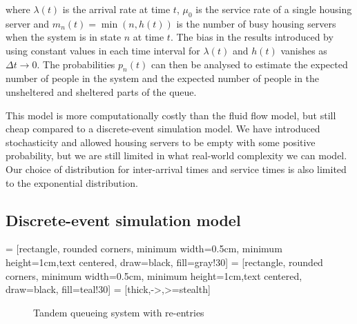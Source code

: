 \documentclass{article}
\begin{document}
% 
where $\lambda(t)$ is the arrival rate at time $t$, $\mu_0$ is the service rate of a single housing server and $m_n(t) = \min(n,h(t))$ is the number of busy housing servers when the system is in state $n$ at time $t$. The bias in the results introduced by using constant values in each time interval for $\lambda(t)$ and $h(t)$ vanishes as $\Delta t \to 0$. The probabilities $p_n(t)$ can then be analysed to estimate the expected number of people in the system and the expected number of people in the unsheltered and sheltered parts of the queue. \newline

This model is more computationally costly than the fluid flow model, but still cheap compared to a discrete-event simulation model. We have introduced stochasticity and allowed housing servers to be empty with some positive probability, but we are still limited in what real-world complexity we can model. Our choice of distribution for inter-arrival times and service times is also limited to the exponential distribution. 

\subsection{Discrete-event simulation model} \label{DES}

 = [rectangle, rounded corners, minimum width=0.5cm, minimum height=1cm,text centered, draw=black, fill=gray!30]
 = [rectangle, rounded corners, minimum width=0.5cm, minimum height=1cm,text centered, draw=black, fill=teal!30]
 = [thick,->,>=stealth]

\begin{figure}
  \begin{center}
    \caption{Tandem queueing system with re-entries} \label{fig:des-q}
  \end{center}
\end{figure}
\end{document}
